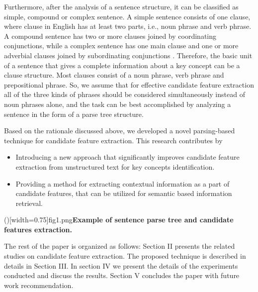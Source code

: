 \documentclass{ieeeaccess}
\begin{document}
Furthermore, after the analysis of a sentence  structure, it can be classified as simple, compound or complex sentence. A simple sentence consists of one clause, where clause in English has at least two parts, i.e., noun phrase and verb phrase. A compound sentence has two or more clauses joined by coordinating conjunctions, while a complex sentence has one main clause and one or more adverbial clauses joined by subordinating conjunctions \cite{b3}. Therefore, the basic unit of a  sentence that gives a complete information about a key concept can be a clause structure. Most clauses consist of a noun  phrase, verb phrase and prepositional phrase. So,  we assume that for effective candidate feature extraction all of the  three kinds of phrases should be considered simultaneously instead of noun phrases alone, and the task can be best  accomplished by analyzing a sentence in the form of a parse tree structure. 
		
Based on the rationale discussed above, we developed a novel parsing-based technique for candidate feature extraction.  This research contributes by
\begin{itemize}	
	\item Introducing a new approach that significantly improves candidate feature extraction from unstructured text for key concepts identification.
	\item Providing a method for extracting contextual information as a part of candidate features, that can be utilized for semantic based information retrieval.
\end{itemize}

\Figure[!h] ()[width=0.75\linewidth]{fig1.png}{\textbf{Example of sentence parse tree and candidate features
extraction.\label{fig:f1}}}

The rest of the paper is organized as follows: Section II presents the related studies on candidate feature extraction. The proposed technique is described in details in Section III. In section IV we present the details of the experiments conducted and discuss the results. Section V concludes the paper with future work recommendation.
\end{document}
